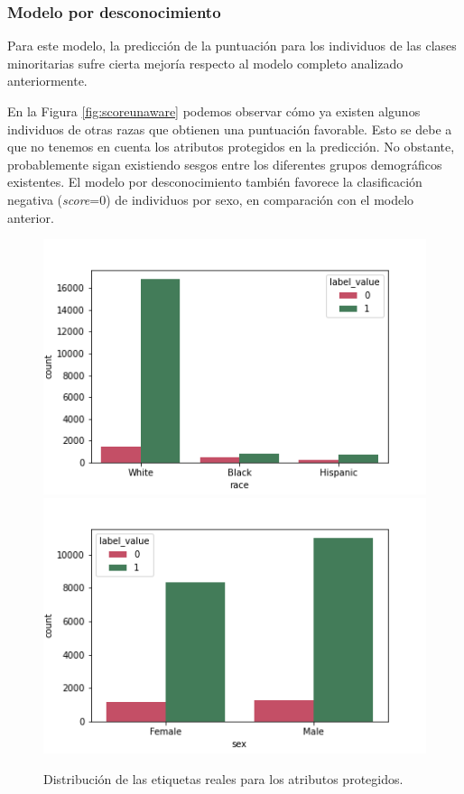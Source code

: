 \documentclass[oneside,openright,titlepage,numbers=noenddot,openany,headinclude,footinclude=true,
cleardoublepage=empty,abstractoff,BCOR=5mm,paper=a4,fontsize=12pt,main=spanish]{scrreprt}
\begin{document}
\subsubsection*{Modelo por desconocimiento}

Para este modelo, la predicción de la puntuación para los individuos de las clases minoritarias sufre cierta mejoría respecto al modelo completo analizado anteriormente.

En la Figura \ref{fig:scoreunaware} podemos observar cómo ya existen algunos individuos de otras razas que obtienen una puntuación favorable. Esto se debe a que no tenemos en cuenta los atributos protegidos en la predicción. No obstante, probablemente sigan existiendo sesgos entre los diferentes grupos demográficos existentes. El modelo por desconocimiento también favorece la clasificación negativa (\textit{score}=0) de individuos por sexo, en comparación con el modelo anterior.\\

\begin{figure}[H]
      \includegraphics[width=\linewidth]{images/label_race_law_2.png}
    \endminipage\hfill
      \includegraphics[width=\linewidth]{images/label_sex_law_2.png}
    \endminipage
     \caption{Distribución de las etiquetas reales para los atributos protegidos.}
     \label{fig:labelracesex4}
\end{figure}
\end{document}
